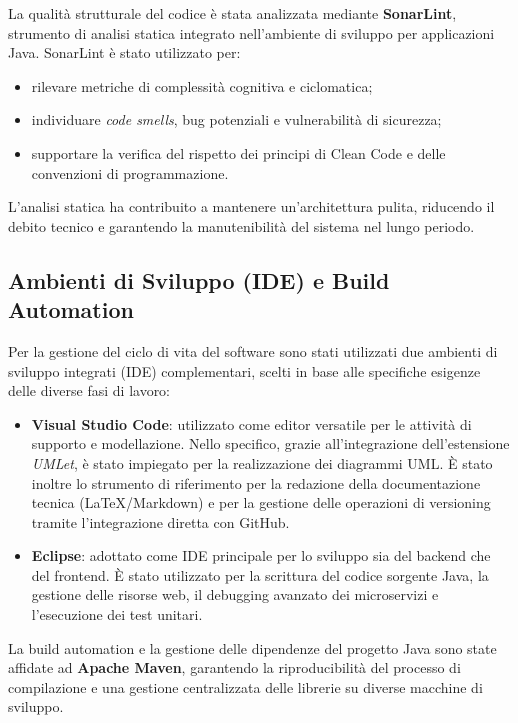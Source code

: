 La qualità strutturale del codice è stata analizzata mediante \textbf{SonarLint}, strumento di analisi statica integrato nell'ambiente di sviluppo per applicazioni Java. SonarLint è stato utilizzato per:
\begin{itemize}
    \item rilevare metriche di complessità cognitiva e ciclomatica;
    \item individuare \textit{code smells}, bug potenziali e vulnerabilità di sicurezza;
    \item supportare la verifica del rispetto dei principi di Clean Code e delle convenzioni di programmazione.
\end{itemize}

L’analisi statica ha contribuito a mantenere un’architettura pulita, riducendo il debito tecnico e garantendo la manutenibilità del sistema nel lungo periodo.

\newpage

\subsection{Ambienti di Sviluppo (IDE) e Build Automation}

Per la gestione del ciclo di vita del software sono stati utilizzati due ambienti di sviluppo integrati (IDE) complementari, scelti in base alle specifiche esigenze delle diverse fasi di lavoro:

\begin{itemize}
    \item \textbf{Visual Studio Code}: utilizzato come editor versatile per le attività di supporto e modellazione. Nello specifico, grazie all'integrazione dell'estensione \textit{UMLet}, è stato impiegato per la realizzazione dei diagrammi UML. È stato inoltre lo strumento di riferimento per la redazione della documentazione tecnica (LaTeX/Markdown) e per la gestione delle operazioni di versioning tramite l'integrazione diretta con GitHub.
    \item \textbf{Eclipse}: adottato come IDE principale per lo sviluppo sia del backend che del frontend. È stato utilizzato per la scrittura del codice sorgente Java, la gestione delle risorse web, il debugging avanzato dei microservizi e l'esecuzione dei test unitari.
\end{itemize}

La build automation e la gestione delle dipendenze del progetto Java sono state affidate ad \textbf{Apache Maven}, garantendo la riproducibilità del processo di compilazione e una gestione centralizzata delle librerie su diverse macchine di sviluppo.

